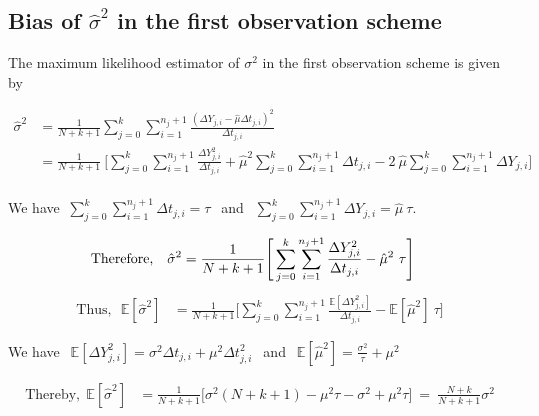 \begin{appendices}

\section{Bias of $\hat{\sigma}^2$ in the first observation scheme}

The maximum likelihood estimator of $\sigma^2$ in the first observation scheme is given by  

\begin{align*}
\hat{\sigma}^2&=\frac{1}{N+k+1}\sum \limits_{j=0}^{k}\sum\limits_{i=1}^{n_j+1} \frac{\displaystyle(\Delta Y_{j,i}-\hat{\mu}\Delta t_{j,i})^2}{ \displaystyle \Delta t_{j,i}}\\
&=\frac{1}{N+k+1} \ \Bigg[\sum\limits_{j=0}^{k}\sum\limits_{i=1}^{n_j+1} \frac{\Delta Y_{j,i}^2}{ \Delta t_{j,i}}+\hat\mu^2 \sum\limits_{j=0}^{k}\sum\limits_{i=1}^{n_j+1}\Delta t_{j,i}-2\ \hat\mu \sum\limits_{j=0}^{k}\sum\limits_{i=1}^{n_j+1}\Delta Y_{j,i}\Bigg]\\
\end{align*}

\hspace{2 mm} We have $ \ \displaystyle \sum\limits_{j=0}^{k}\sum\limits_{i=1}^{n_j+1}\Delta t_{j,i}=\tau\ \ $ and $ \ \ \displaystyle \sum\limits_{j=0}^{k}\sum\limits_{i=1}^{n_j+1}\Delta Y_{j,i}=\hat\mu \ \tau$.



\begin{align*}
\noindent \mbox{Therefore,} \ \ \ \hat{\sigma}^2&=\frac{1}{N+k+1} \Bigg[ \sum\limits_{j=0}^{k}\sum\limits_{i=1}^{n_j+1} \frac{\Delta Y_{j,i}^2}{ \Delta t_{j,i}} - \hat\mu^2\ \tau\Bigg]
\end{align*}
\begin{align*}
\text{Thus,}\ \ \ \mathbb{E}[\hat{\sigma}^2]&=\frac{1}{N+k+1} \Bigg[ \sum\limits_{j=0}^{k}\sum\limits_{i=1}^{n_j+1} \frac{\mathbb{E}[\Delta Y_{j,i}^2]}{ \Delta t_{j,i}} - \mathbb{E}[\hat\mu^2]\ \tau\Bigg]
\end{align*}

\hspace{2 mm} We have $\ \ \mathbb{E}[\Delta Y_{j,i}^2]=\sigma^2 \Delta t_{j,i}+ \mu^2 \Delta t_{j,i}^2\ \ $ and $\ \ \mathbb{E}[\hat\mu^2]=\frac{\sigma^2}{\tau}+\mu^2$ 

\begin{align*}
\mbox{Thereby,}\ \  \mathbb{E}[\hat{\sigma}^2]&= \frac{1}{N+k+1} \Bigg[\sigma^2 (N+k+1)-\mu^2 \tau-\sigma^2+\mu^2\tau\Bigg]\ =\ \frac{ N+k}{N+k+1} \sigma^2
\end{align*}


\end{appendices}
